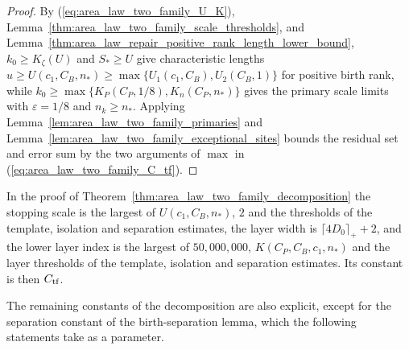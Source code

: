 \begin{proof}
    \leanok
    By (\ref{eq:area_law_two_family_U_K}),
    Lemma~\ref{thm:area_law_two_family_scale_thresholds}, and
    Lemma~\ref{thm:area_law_repair_positive_rank_length_lower_bound},
    $k_0\ge K_\zeta(U)$ and $S_*\ge U$ give characteristic lengths
    $u\ge U(c_1,C_B,n_*)\ge\max\{U_1(c_1,C_B),U_2(C_B,1)\}$ for positive birth
    rank, while $k_0\ge\max\{K_P(C_P,1/8),K_n(C_P,n_*)\}$ gives the primary
    scale limits with $\varepsilon=1/8$ and $n_k\ge n_*$. Applying
    Lemma~\ref{lem:area_law_two_family_primaries} and
    Lemma~\ref{lem:area_law_two_family_exceptional_sites} bounds the residual
    set and error sum by the two arguments of $\max$ in
    (\ref{eq:area_law_two_family_C_tf}).
\end{proof}

In the proof of Theorem~\ref{thm:area_law_two_family_decomposition} the
stopping scale is the largest of $U(c_1,C_B,n_*)$, $2$ and the thresholds of
the template, isolation and separation estimates, the layer width is
$\lceil4D_0\rceil_++2$, and the lower layer index is the largest of
$50{,}000{,}000$, $K(C_P,C_B,c_1,n_*)$ and the layer thresholds of the
template, isolation and separation estimates. Its constant is then
$C_{\rm tf}$.

The remaining constants of the decomposition are also explicit, except for
the separation constant of the birth-separation lemma, which the following
statements take as a parameter.


